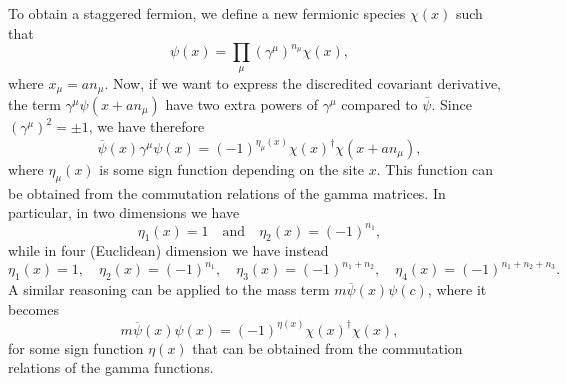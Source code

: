 To obtain a staggered fermion, we define a new fermionic species $\chi(x)$ such that
\begin{equation}
    \psi(x) = \prod_{\mu} (\gamma^{\mu})^{n_{\mu}} \chi(x),
\end{equation}
where $x_{\mu} = an_{\mu}$.
Now, if we want to express the discredited covariant derivative, the term $\gamma^{\mu} \psi(x+a n_{\mu})$ have two extra powers of $\gamma^{\mu}$ compared to $\overline{\psi}$.
Since $(\gamma^{\mu})^2 = \pm 1$, we have therefore
\begin{equation}
    \overline{\psi}(x) \gamma^{\mu} \psi(x) = (-1)^{\eta_{\mu}(x)} \chi(x)^{\dagger} \chi(x + a n_{\mu}),
\end{equation}
where $\eta_{\mu}(x)$ is some sign function depending on the site $x$.
This function can be obtained from the commutation relations of the gamma matrices.
In particular, in two dimensions we have
\begin{equation}
    \eta_1(x) = 1
    \quad \text{and} \quad
    \eta_2(x) = (-1)^{n_1},
\end{equation}
while in four (Euclidean) dimension we have instead 
\begin{equation}
    \eta_1(x) = 1, \quad
    \eta_2(x) = (-1)^{n_1}, \quad
    \eta_3(x) = (-1)^{n_1 + n_2}, \quad
    \eta_4(x) = (-1)^{n_1 + n_2 + n_3}.
\end{equation}
A similar reasoning can be applied to the mass term $m \overline{\psi}(x) \psi(c)$, where it becomes
\begin{equation}
    m \overline{\psi}(x) \psi(x) = (-1)^{\eta(x)} \chi(x)^{\dagger} \chi(x),
\end{equation}
for some sign function $\eta(x)$ that can be obtained from the commutation relations of the gamma functions.
